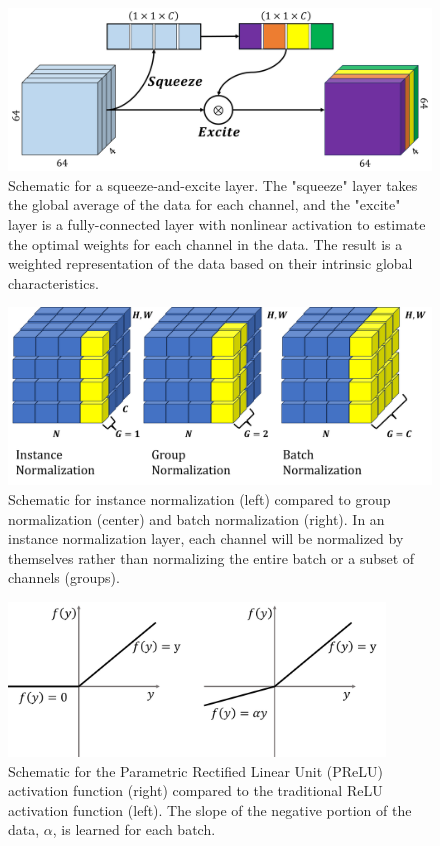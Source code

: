 \documentclass[10pt, twoside]{article}
\begin{document}
\begin{figure}[h]
    \centering
    \includegraphics[width=12cm]{figures/squeeze-excite.png}
    \caption{Schematic for a squeeze-and-excite layer. The "squeeze" layer takes the global average of the data for each channel, and the "excite" layer is a fully-connected layer with nonlinear activation to estimate the optimal weights for each channel in the data. The result is a weighted representation of the data based on their intrinsic global characteristics.}
    \label{squeeze-excite}
\end{figure}

\begin{figure}[h]
    \centering
    \includegraphics[width=12cm]{figures/instance-norm.png}
    \caption{Schematic for instance normalization (left) compared to group normalization (center) and batch normalization (right). In an instance normalization layer, each channel will be normalized by themselves rather than normalizing the entire batch or a subset of channels (groups).}
    \label{instance-norm}
\end{figure}

\begin{figure}[h]
    \centering
    \includegraphics[width=10cm]{figures/prelu.png}
    \caption{Schematic for the Parametric Rectified Linear Unit (PReLU) activation function (right) compared to the traditional ReLU activation function (left). The slope of the negative portion of the data, $\alpha$, is learned for each batch.}
    \label{prelu}
\end{figure}
\end{document}
